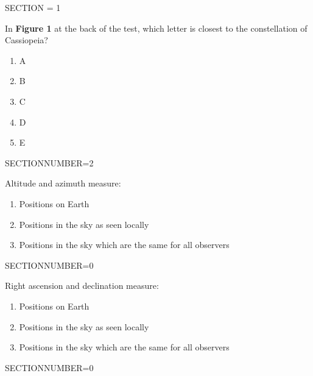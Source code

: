 \documentclass[11pt]{article}
\begin{document}
\begin{enumerate}
\pagebreak 
\begin{minipage}{\textwidth} 
\begin{minipage}{\textwidth} 
\bigskip SECTION = 1
\end{minipage}
\end{minipage}
\begin{minipage}{\textwidth}
\begin{minipage}{\textwidth}
\item In {\bf Figure 1} at the back of the test, which letter is closest to the constellation of  Cassiopeia?
\begin{multicols}{3}
\begin{enumerate} 
\setlength{\itemsep}{1pt} 
\setlength{\parskip}{0pt} 
\setlength{\parsep}{0pt}
\setlength{\multicolsep}{1pt} 
\item A
\item B
\item C
\item D
\item E
\end{enumerate} 
\vfill 
\end{multicols}

\end{minipage}
SECTIONNUMBER=2
\end{minipage}
\vskip 0.20in

\begin{minipage}{\textwidth}
\begin{minipage}{\textwidth}
\item Altitude and azimuth measure:
\begin{enumerate} 
\setlength{\itemsep}{1pt} 
\setlength{\parskip}{0pt} 
\setlength{\parsep}{0pt}
\setlength{\multicolsep}{1pt} 
\item Positions on Earth
\item Positions in the sky as seen locally
\item Positions in the sky which are the same for all observers
\end{enumerate} 
\end{minipage}
SECTIONNUMBER=0
\end{minipage}
\vskip 0.20in

\begin{minipage}{\textwidth}
\begin{minipage}{\textwidth}
\item Right ascension and declination measure:
\begin{enumerate} 
\setlength{\itemsep}{1pt} 
\setlength{\parskip}{0pt} 
\setlength{\parsep}{0pt}
\setlength{\multicolsep}{1pt} 
\item Positions on Earth
\item Positions in the sky as seen locally
\item Positions in the sky which are the same for all observers
\end{enumerate} 
\end{minipage}
SECTIONNUMBER=0
\end{minipage}
\vskip 0.20in


\end{enumerate}
\end{document}
